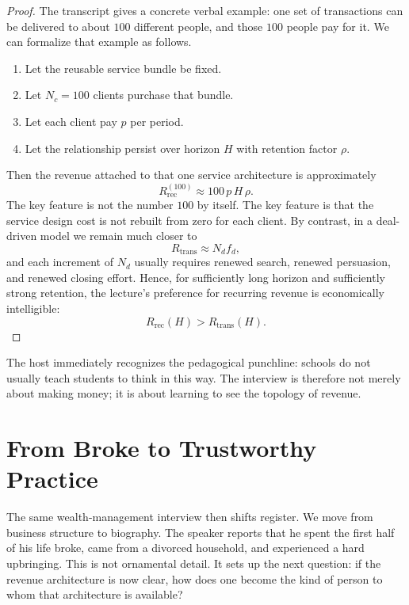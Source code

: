 \begin{proof}
The transcript gives a concrete verbal example: one set of transactions can be delivered to about \(100\) different people, and those \(100\) people pay for it. We can formalize that example as follows.
\begin{enumerate}
\item Let the reusable service bundle be fixed.
\item Let \(N_c = 100\) clients purchase that bundle.
\item Let each client pay \(p\) per period.
\item Let the relationship persist over horizon \(H\) with retention factor \(\rho\).
\end{enumerate}
Then the revenue attached to that one service architecture is approximately
\begin{equation}
R_{\text{rec}}^{(100)} \approx 100\,p\,H\,\rho.
\end{equation}
The key feature is not the number \(100\) by itself. The key feature is that the service design cost is not rebuilt from zero for each client. By contrast, in a deal-driven model we remain much closer to
\begin{equation}
R_{\text{trans}} \approx N_d f_d,
\end{equation}
and each increment of \(N_d\) usually requires renewed search, renewed persuasion, and renewed closing effort. Hence, for sufficiently long horizon and sufficiently strong retention, the lecture's preference for recurring revenue is economically intelligible:
\begin{equation}
R_{\text{rec}}(H) > R_{\text{trans}}(H).
\end{equation}
\end{proof}

The host immediately recognizes the pedagogical punchline: schools do not usually teach students to think in this way. The interview is therefore not merely about making money; it is about learning to see the topology of revenue.

\section{From Broke to Trustworthy Practice}

The same wealth-management interview then shifts register. We move from business structure to biography. The speaker reports that he spent the first half of his life broke, came from a divorced household, and experienced a hard upbringing. This is not ornamental detail. It sets up the next question: if the revenue architecture is now clear, how does one become the kind of person to whom that architecture is available?

